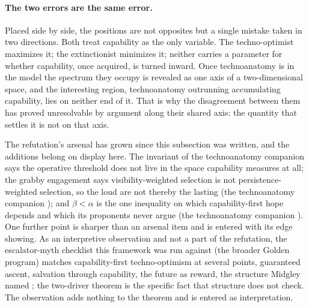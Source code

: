 \paragraph{The two errors are the same error.}\label{hr:rem:sameerror}
Placed side by side, the positions are not opposites but a single
mistake taken in two directions. Both treat capability as the only
variable. The techno-optimist maximizes it; the extinctionist minimizes
it; neither carries a parameter for whether capability, once acquired,
is turned inward. Once technoanatomy is in the model the spectrum they occupy
is revealed as one axis of a two-dimensional space, and the interesting
region, technoanatomy outrunning accumulating capability, lies on
neither end of it. That is why the disagreement between them has proved
unresolvable by argument along their shared axis: the quantity that
settles it is not on that axis.


The refutation's arsenal has grown since this subsection was written,
and the additions belong on display here. The invariant of
the technoanatomy companion \cite{GoldenTechnoanatomy} says the operative threshold does not
live in the space capability measures at all; the grabby engagement
says visibility-weighted selection is not persistence-weighted
selection, so the loud are not thereby the lasting
(the technoanatomy companion \cite{GoldenTechnoanatomy}); and $\beta<\alpha$ is the one
inequality on which capability-first hope depends and which its
proponents never argue (the technoanatomy companion \cite{GoldenTechnoanatomy}). One further
point is sharper than an arsenal item and is entered with its edge
showing. As an interpretive observation and not a part of the refutation, the
escalator-myth checklist this framework was run against
(the broader Golden program) matches capability-first techno-optimism
at several points, guaranteed ascent, salvation through capability,
the future as reward, the structure Midgley named \cite{Midgley85};
the two-driver theorem is the specific fact that structure does not
check. The observation adds nothing to the theorem and is entered as
interpretation.

